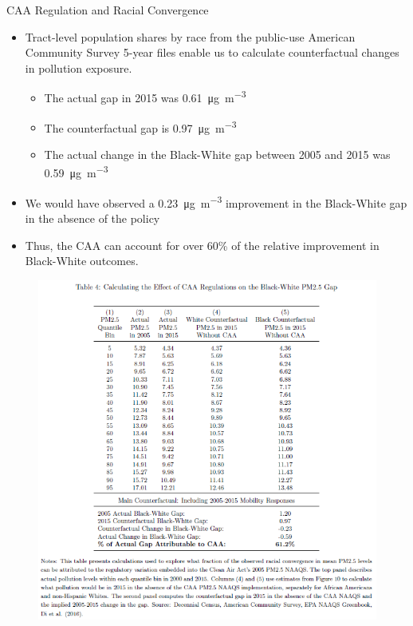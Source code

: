 \documentclass[dvipdfmx,12pt]{beamer}
\begin{document}
\begin{frame}{CAA Regulation and Racial Convergence}
  \begin{itemize}
    \item Tract-level population shares by race from the public-use American Community Survey 5-year files enable us to calculate counterfactual changes in pollution exposure.
    \begin{itemize}
      \item The actual gap in 2015 was \SI[per-mode = symbol]{.61}{\micro \gram \per \cubic \meter}
      \item The counterfactual gap is \SI[per-mode = symbol]{.97}{\micro \gram \per \cubic \meter}
      \item The actual change in the Black-White gap between 2005 and 2015 was \SI[per-mode = symbol]{.59}{\micro \gram \per \cubic \meter}
    \end{itemize}
    \item We would have observed a \SI[per-mode = symbol]{.23}{\micro \gram \per \cubic \meter} improvement in the Black-White gap in the absence of the policy
    \item Thus, the CAA can account for over 60\% of the relative improvement in Black-White outcomes.
  \end{itemize}
\end{frame}

\begin{frame}{}
  \begin{figure}
    \centering
    \includegraphics[scale = .5]{T4.png}
  \end{figure}
\end{frame}
\end{document}
